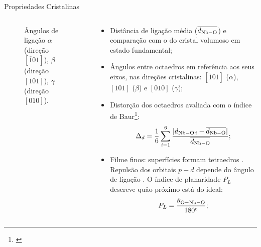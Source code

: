 \begin{frame}{Propriedades Cristalinas}
	\begin{columns}
		\begin{column}{.4\textwidth}
			\begin{figure}[t]
				\centering
				
				\caption{Ângulos de ligação  $\alpha$ (direção $[\overline{1}01]$), $\beta$ (direção $[101]$), $\gamma$ (direção $[010]$).\label{fig:angles}}
			\end{figure}
		\end{column}
		\begin{column}{.5\textwidth}{\small
			\begin{itemize}
				\item Distância de ligação  média ($\overline{d_{\ce{Nb-O}}}$) e comparação com o do cristal volumoso em estado fundamental;
				\item Ângulos entre octaedros em referência aos seus eixos, nas direções cristalinas: $[\overline{1}01]$ ($\alpha$), $[101]$ ($\beta$) e $[010]$ ($\gamma$);
				\item Distorção dos octaedros avaliada com o índice de Baur\footnote[frame]{\cite{baur_geometry_1974}}:
				\begin{equation}
					\Delta_d = \frac{1}{6} \sum^{6}_{i=1} \frac{|d_{\ce{Nb-O}\, i} - \overline{d_{\ce{Nb-O}}}|}{\overline{d_{\ce{Nb-O}}}};
				\end{equation}
				\item Filme finos: superfícies formam tetraedros . Repulsão dos orbitais $p-d$ depende do ângulo de ligação . O índice de planaridade $P_L$ descreve quâo próximo está do ideal:
				\begin{equation}
					P_L = \frac{\theta_{\ce{O-Nb-O}}}{\SI{180}{\degree}};
				\end{equation}
			\end{itemize}}
		\end{column}
	\end{columns}
\end{frame}

